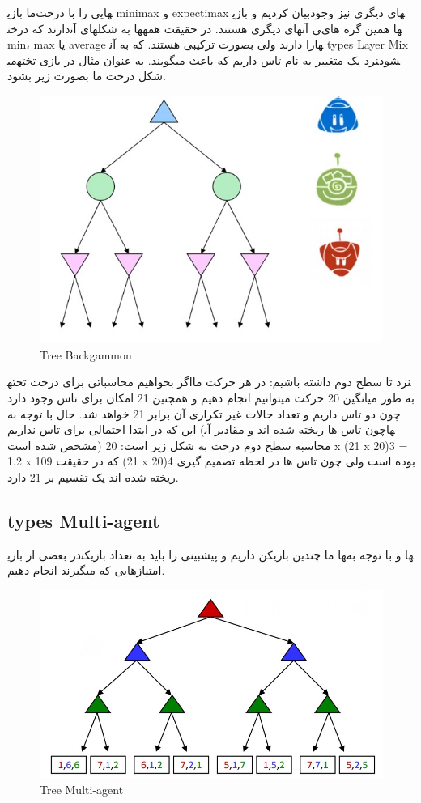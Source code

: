 ما بازی‎هایی را با درخت minimax و expectimax بیان کردیم و بازی‎های دیگری نیز وجود دارند که درخت‎های آن‎ها به شکل‎های دیگری هستند. در حقیقت همه‎ی آن‎ها همین گره های min، max یا average را دارند ولی بصورت ترکیبی هستند. که به آن‎ها types Layer Mix می‎گویند. به عنوان مثال در بازی تخته‎نرد یک متغییر به نام تاس داریم که باعث می‎شود شکل درخت ما بصورت زیر بشود.

\begin{figure}[h!]
    \centering
    \includegraphics[width=0.6\linewidth]{images/backgammonTree.jpg}
    \caption{Tree Backgammon}
\end{figure}

اگر بخواهیم محاسباتی برای درخت تخته‎نرد تا سطح دوم داشته باشیم:
در هر حرکت ما به طور میانگین 20 حرکت میتوانیم انجام دهیم و همچنین 21 امکان برای تاس وجود دارد چون دو تاس داریم و تعداد حالات غیر تکراری آن برابر 21 خواهد شد.
حال با توجه به این که در ابتدا احتمالی برای تاس نداریم (چون تاس ها ریخته شده اند و مقادیر آن‎ها مشخص شده است) محاسبه سطح دوم درخت به شکل زیر است:
20 x (21 x 20)3 = 1.2 x 109
که در حقیقت (21 x 20)4 بوده است ولی چون تاس ها در لحظه تصمیم گیری ریخته شده اند یک تقسیم بر 21 دارد.


\subsection{types Multi-agent}
در بعضی از بازی‎ها ما چندین بازیکن داریم و پیشبینی را باید به تعداد بازیکن‎ها و با توجه به امتیازهایی که میگیرند انجام دهیم.


\begin{figure}[h!]
    \centering
    \includegraphics[width=0.8\linewidth]{images/multiagentTree.jpg}
    \caption{Tree Multi-agent}
\end{figure}


